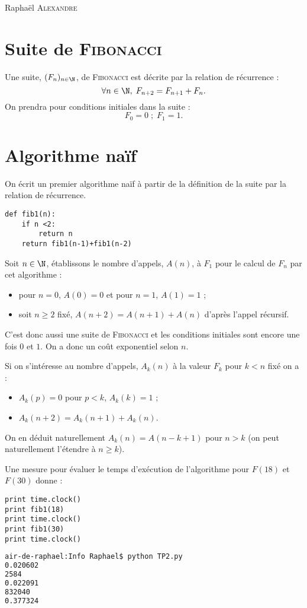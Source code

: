 \documentclass{mybourbaki}
\author{Raphaël Alexandre}
\begin{document}
\begin{center}
Raphaël \textsc{Alexandre}
\end{center}

\bigbreak
\bigbreak

\section*{Suite de \textsc{Fibonacci}}

Une suite, $(F_n)_{n\in \N}$, de \textsc{Fibonacci} est décrite par la relation de récurrence : \[ \forall n \in \N, \; F_{n+2} = F_{n+1} + F_n.\]
On prendra pour conditions initiales dans la suite : \[ F_0 = 0 \; ; \;  F_1 = 1.\]

\section{Algorithme naïf}
On écrit un premier algorithme naïf à partir de la définition de la suite par la relation de récurrence.

\begin{lstlisting}[frame=single] 
def fib1(n):
	if n <2:
		return n
	return fib1(n-1)+fib1(n-2) 
\end{lstlisting}

Soit $n\in \N$, établissons le nombre d'appels, $A(n)$, à $F_1$ pour le calcul de $F_n$ par cet algorithme :
\begin{itemize}
\item pour $n=0$, $A(0) = 0$ et pour $n=1$, $A(1) = 1$ ;
\item soit $n\geq 2$ fixé, $A(n+2) = A(n+1) + A(n)$ d'après l'appel récursif.
\end{itemize}
C'est donc aussi une suite de \textsc{Fibonacci} et les conditions initiales sont encore une fois $0$ et $1$. On a donc un coût exponentiel selon $n$.

Si on s'intéresse au nombre d'appels, $A_k(n)$ à la valeur $F_k$ pour $k<n$ fixé on a :
\begin{itemize}
\item $A_k(p) = 0$ pour $p<k$, $A_k(k) = 1$ ;
\item $A_k(n+2) = A_k(n+1) + A_k(n)$.
\end{itemize}
On en déduit naturellement $A_k(n) = A(n-k+1)$ pour $n>k$ (on peut naturellement l'étendre à $n\geq k$).

Une mesure pour évaluer le temps d'exécution de l'algorithme pour $F(18)$ et $F(30)$ donne :
\begin{lstlisting}[frame = single]
print time.clock()
print fib1(18)
print time.clock()
print fib1(30)
print time.clock()
\end{lstlisting}
\begin{lstlisting}[frame=single,language=bash]
air-de-raphael:Info Raphael$ python TP2.py
0.020602
2584
0.022091
832040
0.377324
\end{lstlisting}
\end{document}
